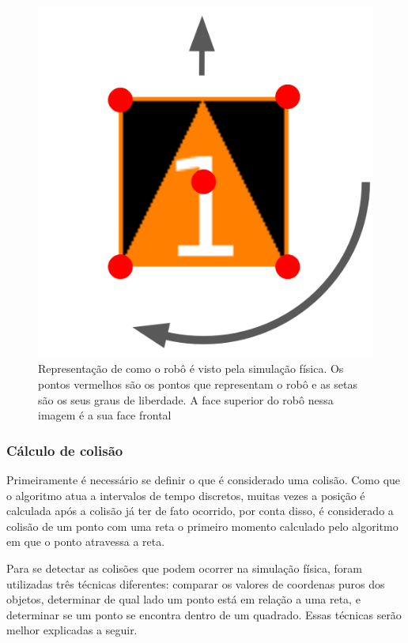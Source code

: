 \begin{figure}[!htb]
    \caption{\label{img:robo_fisica} Representação de como o robô é visto pela simulação física. Os pontos vermelhos são os pontos que representam o robô e as setas são os seus graus de liberdade. A face superior do robô nessa imagem é a sua face frontal}
	\begin{center}
        \includegraphics[scale=0.4]{img/robo_fisica.png}
	\end{center}
\end{figure}

\subsubsection{\label{cap:calc_colisao}Cálculo de colisão}

Primeiramente é necessário se definir o que é considerado uma colisão. Como que o algoritmo atua a intervalos de tempo discretos, muitas vezes a posição é calculada após a colisão já ter de fato ocorrido, por conta disso, é considerado a colisão de um ponto com uma reta o primeiro momento calculado pelo algoritmo em que o ponto atravessa a reta.

Para se detectar as colisões que podem ocorrer na simulação física, foram utilizadas três técnicas diferentes: comparar os valores de coordenas puros dos objetos, determinar de qual lado um ponto está em relação a uma reta, e determinar se um ponto se encontra dentro de um quadrado. Essas técnicas serão melhor explicadas a seguir.

